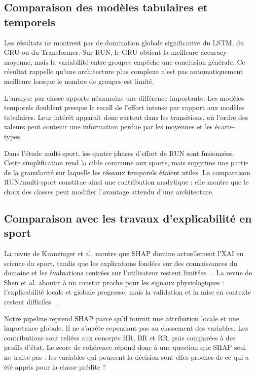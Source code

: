 \documentclass[12pt,a4paper]{article}
\begin{document}
\subsection{Comparaison des modèles tabulaires et temporels}

Les résultats ne montrent pas de domination globale significative du LSTM, du
GRU ou du Transformer. Sur RUN, le GRU obtient la meilleure accuracy moyenne,
mais la variabilité entre groupes empêche une conclusion générale. Ce résultat
rappelle qu'une architecture plus complexe n'est pas automatiquement meilleure
lorsque le nombre de groupes est limité.

L'analyse par classe apporte néanmoins une différence importante. Les modèles
temporels doublent presque le recall de l'effort intense par rapport aux
modèles tabulaires. Leur intérêt apparaît donc surtout dans les transitions,
où l'ordre des valeurs peut contenir une information perdue par les moyennes
et les écarts-types.

Dans l'étude multi-sport, les quatre phases d'effort de RUN sont fusionnées.
Cette simplification rend la cible commune aux sports, mais supprime une
partie de la granularité sur laquelle les réseaux temporels étaient utiles.
La comparaison RUN/multi-sport constitue ainsi une contribution analytique :
elle montre que le choix des classes peut modifier l'avantage attendu d'une
architecture.

\subsection{Comparaison avec les travaux d'explicabilité en sport}

La revue de Kranzinger et al. montre que SHAP domine actuellement l'XAI en
science du sport, tandis que les explications fondées sur des connaissances
du domaine et les évaluations centrées sur l'utilisateur restent limitées
~\cite{kranzinger2025}. La revue de Shen et al. aboutit à un constat proche
pour les signaux physiologiques : l'explicabilité locale et globale progresse,
mais la validation et la mise en contexte restent difficiles
~\cite{shen2025}.

Notre pipeline reprend SHAP parce qu'il fournit une attribution locale et une
importance globale. Il ne s'arrête cependant pas au classement des variables.
Les contributions sont reliées aux concepts HR, BR et RR, puis comparées à des
profils d'état. Le score de cohérence répond donc à une question que SHAP seul
ne traite pas : les variables qui poussent la décision sont-elles proches de
ce qui a été appris pour la classe prédite ?
\end{document}
